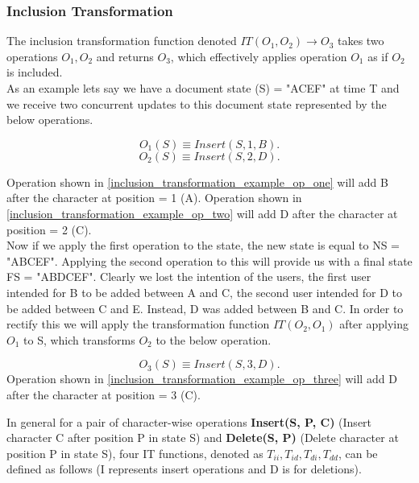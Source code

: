\documentclass[12pt]{article}
\begin{document}
  \subsubsection{Inclusion Transformation}
  The inclusion transformation function denoted \(IT(O_{1}, O_{2}) \rightarrow O_{3}\) takes two operations \(O_{1}, O_{2}\) and returns \(O_{3}\),
  which effectively applies operation \(O_{1}\) as if \(O_{2}\) is included. \\

  As an example lets say we have a document state (S) = "ACEF" at time T and we receive two concurrent updates to this document state represented by the below operations.

  \begin{equation} \label{inclusion_transformation_example_op_one}
    O_{1}(S) \equiv Insert(S, 1, B).
  \end{equation}
  \begin{equation} \label{inclusion_transformation_example_op_two}
    O_{2}(S) \equiv Insert(S, 2, D).
  \end{equation}

  Operation shown in \ref{inclusion_transformation_example_op_one} will add B after the character at position = 1 (A).
  Operation shown in \ref{inclusion_transformation_example_op_two} will add D after the character at position = 2 (C). \\

  Now if we apply the first operation to the state, the new state is equal to NS = "ABCEF". Applying the second operation to this will provide us with a final state FS = "ABDCEF".
  Clearly we lost the intention of the users, the first user intended for B to be added between A and C, the second user intended for D to be added between C and E.
  Instead, D was added between B and C. In order to rectify this we will apply the transformation function \(IT(O_{2}, O_{1})\) after applying \(O_{1}\) to S,
  which transforms \(O_{2}\) to the below operation.

  \begin{equation} \label{inclusion_transformation_example_op_three}
    O_{3}(S) \equiv Insert(S, 3, D).
  \end{equation}
  Operation shown in \ref{inclusion_transformation_example_op_three} will add D after the character at position = 3 (C).

  In general for a pair of character-wise operations \textbf{Insert(S, P, C)} (Insert character C after position P in state S) and
  \textbf{Delete(S, P)} (Delete character at position P in state S), four IT functions, denoted as \(T_{ii}, T_{id}, T_{di}, T_{dd}\), 
  can be defined as follows (I represents insert operations and D is for deletions).
\end{document}

